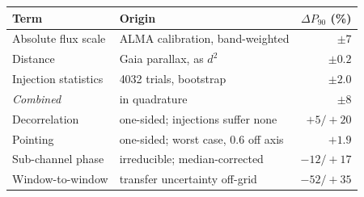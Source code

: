 \begin{tabular}{@{}l@{~}l@{~}r@{}}
\hline
Term & Origin & $\Delta P_{90}$ (\%) \\
\hline
Absolute flux scale & ALMA calibration, band-weighted & $\pm7$ \\
Distance & Gaia parallax, as $d^{2}$ & $\pm0.2$ \\
Injection statistics & 4032 trials, bootstrap & $\pm2.0$ \\
\hline
\emph{Combined} & in quadrature & $\pm8$ \\
\hline
Decorrelation & one-sided; injections suffer none & $+5/+20$ \\
Pointing & one-sided; worst case, 0.6\arcsec{} off axis & $+1.9$ \\
Sub-channel phase & irreducible; median-corrected & $-12/+17$ \\
Window-to-window & transfer uncertainty off-grid & $-52/+35$ \\
\hline
\end{tabular}
